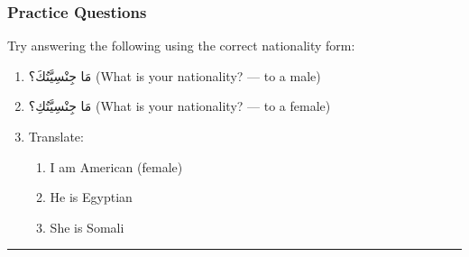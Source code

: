 \documentclass[
  a4paper,
  DIV=11,
  numbers=noendperiod]{scrartcl}
\providecommand{\tightlist}{%
  \setlength{\itemsep}{0pt}\setlength{\parskip}{0pt}}
\begin{document}
\subsubsection{Practice Questions}\label{practice-questions}

Try answering the following using the correct nationality form:

\begin{enumerate}
\def\labelenumi{\arabic{enumi}.}
\tightlist
\item
  مَا جِنْسِيَّتُكَ؟ (What is your nationality? --- to a male)\\
\item
  مَا جِنْسِيَّتُكِ؟ (What is your nationality? --- to a female)\\
\item
  Translate:

  \begin{enumerate}
  \def\labelenumii{\alph{enumii}.}
  \tightlist
  \item
    I am American (female)\\
  \item
    He is Egyptian\\
  \item
    She is Somali
  \end{enumerate}
\end{enumerate}

\begin{center}\rule{0.5\linewidth}{0.5pt}\end{center}
\end{document}
